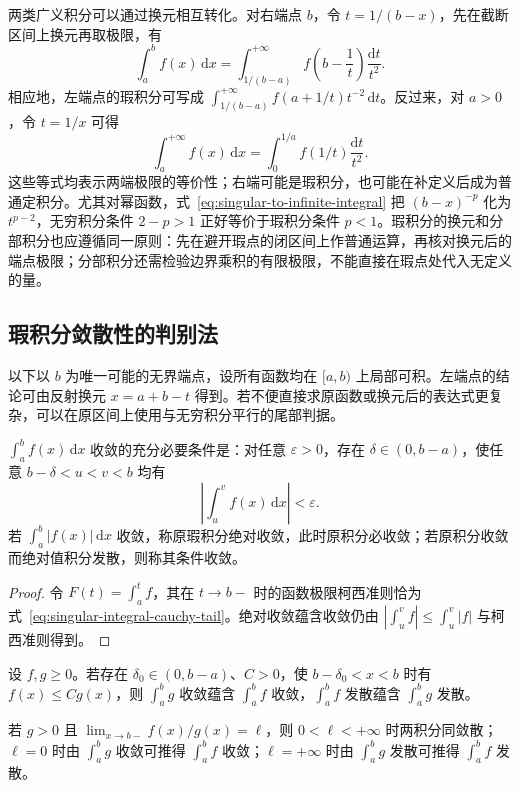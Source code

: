 两类广义积分可以通过换元相互转化。对右端点 $b$，令 $t=1/(b-x)$，先在截断区间上换元再取极限，有
\begin{equation}
    \int_a^b f(x)\,\mathrm{d}x
    =\int_{1/(b-a)}^{+\infty}
        f\left(b-\frac1t\right)\frac{\mathrm{d}t}{t^2}.
    \label{eq:singular-to-infinite-integral}
\end{equation}
相应地，左端点的瑕积分可写成 $\int_{1/(b-a)}^{+\infty}f(a+1/t)t^{-2}\,\mathrm{d}t$。反过来，对 $a>0$，令 $t=1/x$ 可得
\[
    \int_a^{+\infty}f(x)\,\mathrm{d}x
    =\int_0^{1/a}f(1/t)\frac{\mathrm{d}t}{t^2}.
\]
这些等式均表示两端极限的等价性；右端可能是瑕积分，也可能在补定义后成为普通定积分。尤其对幂函数，式~\eqref{eq:singular-to-infinite-integral} 把 $(b-x)^{-p}$ 化为 $t^{p-2}$，无穷积分条件 $2-p>1$ 正好等价于瑕积分条件 $p<1$。瑕积分的换元和分部积分也应遵循同一原则：先在避开瑕点的闭区间上作普通运算，再核对换元后的端点极限；分部积分还需检验边界乘积的有限极限，不能直接在瑕点处代入无定义的量。

\subsection{瑕积分敛散性的判别法}
\label{subsec:convergence-tests-for-singular-integrals}

以下以 $b$ 为唯一可能的无界端点，设所有函数均在 $[a,b)$ 上局部可积。左端点的结论可由反射换元 $x=a+b-t$ 得到。若不便直接求原函数或换元后的表达式更复杂，可以在原区间上使用与无穷积分平行的尾部判据。

\begin{theorem}[瑕积分的柯西准则与绝对收敛]
\label{thm:cauchy-and-absolute-singular-integrals}
$\int_a^b f(x)\,\mathrm{d}x$ 收敛的充分必要条件是：对任意 $\varepsilon>0$，存在 $\delta\in(0,b-a)$，使任意 $b-\delta<u<v<b$ 均有
\begin{equation}
    \left|\int_u^v f(x)\,\mathrm{d}x\right|<\varepsilon.
    \label{eq:singular-integral-cauchy-tail}
\end{equation}
若 $\int_a^b|f(x)|\,\mathrm{d}x$ 收敛，称原瑕积分绝对收敛，此时原积分必收敛；若原积分收敛而绝对值积分发散，则称其条件收敛。
\end{theorem}

\begin{proof}
令 $F(t)=\int_a^t f$，其在 $t\to b-$ 时的函数极限柯西准则恰为式~\eqref{eq:singular-integral-cauchy-tail}。绝对收敛蕴含收敛仍由 $|\int_u^v f|\leq\int_u^v|f|$ 与柯西准则得到。
\end{proof}

\begin{theorem}[瑕积分的比较判别法]
\label{thm:comparison-tests-singular-integrals}
设 $f,g\geq0$。若存在 $\delta_0\in(0,b-a)$、$C>0$，使 $b-\delta_0<x<b$ 时有 $f(x)\leq Cg(x)$，则 $\int_a^b g$ 收敛蕴含 $\int_a^b f$ 收敛，$\int_a^b f$ 发散蕴含 $\int_a^b g$ 发散。

若 $g>0$ 且 $\lim_{x\to b-}f(x)/g(x)=\ell$，则 $0<\ell<+\infty$ 时两积分同敛散；$\ell=0$ 时由 $\int_a^b g$ 收敛可推得 $\int_a^b f$ 收敛；$\ell=+\infty$ 时由 $\int_a^b g$ 发散可推得 $\int_a^b f$ 发散。
\end{theorem}

